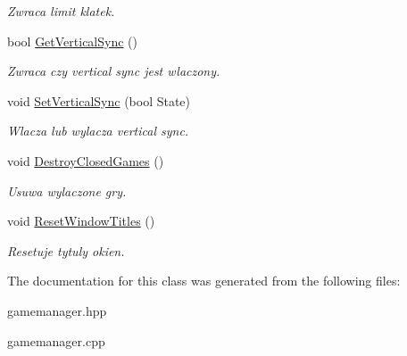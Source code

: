 \begin{DoxyCompactItemize}
\begin{DoxyCompactList}\small\item\em Zwraca limit klatek. \end{DoxyCompactList}\item 
\mbox{\label{classtfp_1_1_game_manager_class_a0170069612e7be58e7e32b9db8993d81}} 
bool \mbox{\hyperlink{classtfp_1_1_game_manager_class_a0170069612e7be58e7e32b9db8993d81}{Get\+Vertical\+Sync}} ()
\begin{DoxyCompactList}\small\item\em Zwraca czy vertical sync jest wlaczony. \end{DoxyCompactList}\item 
\mbox{\label{classtfp_1_1_game_manager_class_abaf59b5c37b5b9182d22e9fbe73c619f}} 
void \mbox{\hyperlink{classtfp_1_1_game_manager_class_abaf59b5c37b5b9182d22e9fbe73c619f}{Set\+Vertical\+Sync}} (bool State)
\begin{DoxyCompactList}\small\item\em Wlacza lub wylacza vertical sync. \end{DoxyCompactList}\item 
\mbox{\label{classtfp_1_1_game_manager_class_a8b23f467f8f9400e600ccfbd90e61cc8}} 
void \mbox{\hyperlink{classtfp_1_1_game_manager_class_a8b23f467f8f9400e600ccfbd90e61cc8}{Destroy\+Closed\+Games}} ()
\begin{DoxyCompactList}\small\item\em Usuwa wylaczone gry. \end{DoxyCompactList}\item 
\mbox{\label{classtfp_1_1_game_manager_class_ac5f5c8aa8476a664aec59cd40e39586b}} 
void \mbox{\hyperlink{classtfp_1_1_game_manager_class_ac5f5c8aa8476a664aec59cd40e39586b}{Reset\+Window\+Titles}} ()
\begin{DoxyCompactList}\small\item\em Resetuje tytuly okien. \end{DoxyCompactList}\end{DoxyCompactItemize}


The documentation for this class was generated from the following files\+:\begin{DoxyCompactItemize}
\item 
gamemanager.\+hpp\item 
gamemanager.\+cpp\end{DoxyCompactItemize}
